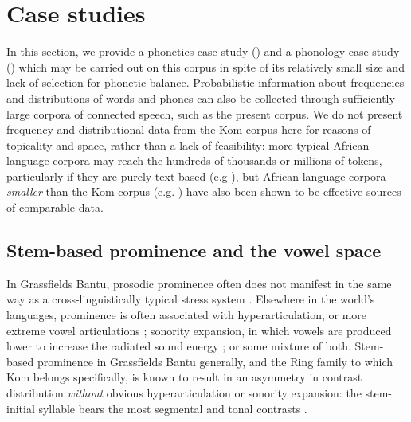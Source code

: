 \documentclass[output=paper,colorlinks,citecolor=brown
]{langscibook}
\begin{document}
\section{Case studies} \label{corpus-usage}

In this section, we provide a phonetics case study () and a phonology case study () which may be carried out on this corpus in spite of its relatively small size and lack of selection for phonetic balance. 
Probabilistic information about frequencies and distributions of words and phones can also be collected through sufficiently large corpora of connected speech, such as the present corpus.  
We do not present frequency and distributional data from the Kom corpus here for reasons of topicality and space, rather than a lack of feasibility: 
more typical African language corpora may reach the hundreds of thousands or millions of tokens, particularly if they are purely text-based (e.g \cite{prinsloo, deschryver}), but African language corpora \textit{smaller} than the Kom corpus (e.g. \cite{bostoen-kikongo}) have also been shown to be effective sources of comparable data. 

\subsection{Stem-based prominence and the vowel space} \label{prominence}

In Grassfields Bantu, prosodic prominence often does not manifest in the same way as a cross-linguistically typical stress system \citep{franich2021metrical}. 
Elsewhere in the world's languages, prominence is often associated with hyperarticulation, or more extreme vowel articulations \citep{lindblom1990explaining, dejong1995supraglottal}; sonority expansion, in which vowels are produced lower to increase the radiated sound energy \citep{dejong1993interplay, cho2005prosodic, mo2009prosodic}; or some mixture of both. 
Stem-based prominence in Grassfields Bantu generally, and the Ring family to which Kom belongs specifically, is known to result in an asymmetry in contrast distribution \textit{without} obvious hyperarticulation or sonority expansion: the stem-initial syllable bears the most segmental and tonal contrasts \citep{hyman2019niger, franich2021metrical, faytak2021kejom}. 
\end{document}
